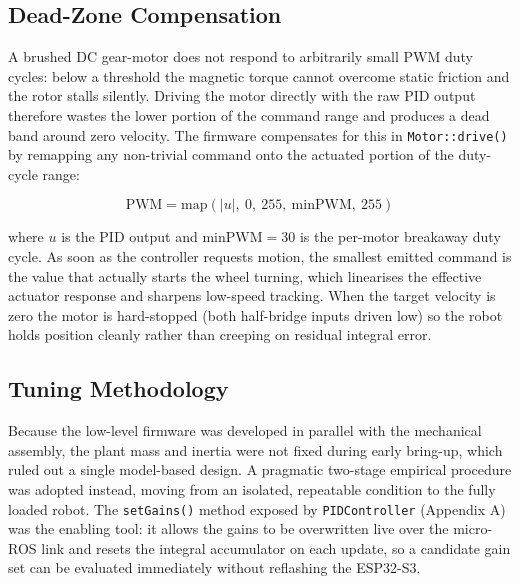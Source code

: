 \subsection{Dead-Zone Compensation}
\label{subsec:deadzone}

A brushed DC gear-motor does not respond to arbitrarily small PWM duty cycles: below a threshold the magnetic torque cannot overcome static friction and the rotor stalls silently. Driving the motor directly with the raw PID output therefore wastes the lower portion of the command range and produces a dead band around zero velocity. The firmware compensates for this in \texttt{Motor::drive()} by remapping any non-trivial command onto the actuated portion of the duty-cycle range:

\begin{equation}
    \mathrm{PWM} = \mathrm{map}(|u|,\ 0,\ 255,\ \mathrm{minPWM},\ 255)
    \label{eq:deadzone_map}
\end{equation}

where $u$ is the PID output and $\mathrm{minPWM} = 30$ is the per-motor breakaway duty cycle. As soon as the controller requests motion, the smallest emitted command is the value that actually starts the wheel turning, which linearises the effective actuator response and sharpens low-speed tracking. When the target velocity is zero the motor is hard-stopped (both half-bridge inputs driven low) so the robot holds position cleanly rather than creeping on residual integral error.

\subsection{Tuning Methodology}
\label{subsec:pid_tuning}

Because the low-level firmware was developed in parallel with the mechanical assembly, the plant mass and inertia were not fixed during early bring-up, which ruled out a single model-based design. A pragmatic two-stage empirical procedure was adopted instead, moving from an isolated, repeatable condition to the fully loaded robot. The \texttt{setGains()} method exposed by \texttt{PIDController} (Appendix A) was the enabling tool: it allows the gains to be overwritten live over the micro-ROS link and resets the integral accumulator on each update, so a candidate gain set can be evaluated immediately without reflashing the ESP32-S3.


